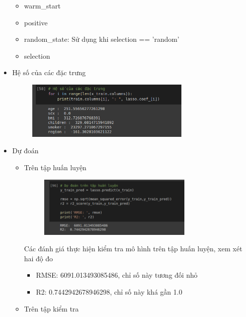 \documentclass{article}
\begin{document}
\begin{itemize}
\begin{itemize}
			\item warm\_start
			\item positive
			\item random\_state: Sử dụng khi selection == 'random'
			\item selection
		\end{itemize}
		\item Hệ số của các đặc trưng
		\begin{figure}[H]
			\centering
			\includegraphics[width=0.75\textwidth]{images/lasso_reg/lasso_features_slope.png}
		\end{figure}
		\item Dự đoán
		\begin{itemize}
			\item Trên tập huấn luyện
			\begin{figure}[H]
				\centering
				\includegraphics[width=0.75\textwidth]{images/lasso_reg/lasso_train_predict.png}
			\end{figure}
		Các đánh giá thực hiện kiểm tra mô hình trên tập huấn luyện, xem xét hai độ đo
		\begin{itemize}
			\item RMSE:  6091.013493085486, chỉ số này tương đối nhỏ
			\item R2:  0.7442942678946298, chỉ số này khá gần 1.0
		\end{itemize}
			\item Trên tập kiểm tra
			\begin{figure}[H]
				\centering

\end{figure}
\end{itemize}
\end{itemize}
\end{document}
